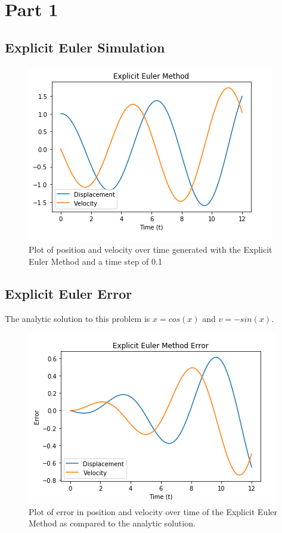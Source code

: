 \documentclass{article}
\title{Ph20 Problem Set #3}
\author{Morgaine Mandigo-Stoba}
\date{Section 1}
\begin{document}
\maketitle

\section{Part 1}

\subsection{Explicit Euler Simulation}

\begin{figure}[h!]
\centering
\includegraphics[scale=0.35]{exp_euler.png}
\caption{Plot of position and velocity over time generated with the Explicit Euler Method and a time step of 0.1}
\label{fig:expeuler}
\end{figure}

\subsection{Explicit Euler Error}

The analytic solution to this problem is $x=cos(x)$ and $v=-sin(x)$. 

\begin{figure}[h!]
\centering
\includegraphics[scale=0.35]{exp_euler_err.png}
\caption{Plot of error in position and velocity over time of the Explicit Euler Method as compared to the analytic solution.}
\label{fig:expeulererr}
\end{figure}
\end{document}
